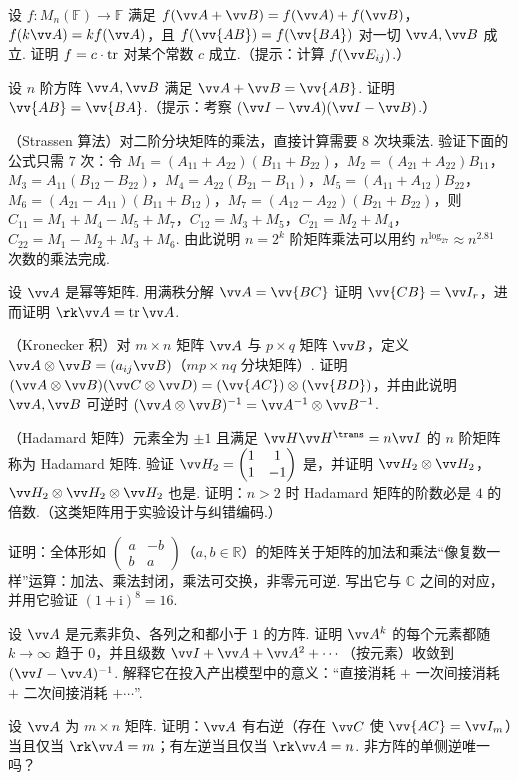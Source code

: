 {		\Cgroup
		\begin{exC}
			\item\label{ex:mat:C1} 设 $f:M_n(\mathbb{F})\to\mathbb{F}$ 满足 $f(\vv A+\vv B)=f(\vv A)+f(\vv B)$，$f(k\vv A)=kf(\vv A)$，且 $f(\vv{AB})=f(\vv{BA})$ 对一切 $\vv A,\vv B$ 成立. 证明 $f=c\cdot\operatorname{tr}$ 对某个常数 $c$ 成立.（提示：计算 $f(\vv E_{ij})$.）
			\item\label{ex:mat:C2} 设 $n$ 阶方阵 $\vv A,\vv B$ 满足 $\vv A+\vv B=\vv{AB}$. 证明 $\vv{AB}=\vv{BA}$.（提示：考察 $(\vv I-\vv A)(\vv I-\vv B)$.）
			\item\label{ex:mat:C3} （Strassen 算法）对二阶分块矩阵的乘法，直接计算需要 $8$ 次块乘法. 验证下面的公式只需 $7$ 次：令
			$M_1=(A_{11}+A_{22})(B_{11}+B_{22})$，$M_2=(A_{21}+A_{22})B_{11}$，$M_3=A_{11}(B_{12}-B_{22})$，$M_4=A_{22}(B_{21}-B_{11})$，$M_5=(A_{11}+A_{12})B_{22}$，$M_6=(A_{21}-A_{11})(B_{11}+B_{12})$，$M_7=(A_{12}-A_{22})(B_{21}+B_{22})$，则
			$C_{11}=M_1+M_4-M_5+M_7$，$C_{12}=M_3+M_5$，$C_{21}=M_2+M_4$，$C_{22}=M_1-M_2+M_3+M_6$. 由此说明 $n=2^k$ 阶矩阵乘法可以用约 $n^{\log_27}\approx n^{2.81}$ 次数的乘法完成.
			\item\label{ex:mat:C4} 设 $\vv A$ 是幂等矩阵. 用满秩分解 $\vv A=\vv{BC}$ 证明 $\vv{CB}=\vv I_r$，进而证明 $\rk\vv A=\tr\vv A$.
			\item\label{ex:mat:C5} （Kronecker 积）对 $m\times n$ 矩阵 $\vv A$ 与 $p\times q$ 矩阵 $\vv B$，定义 $\vv A\otimes\vv B=(a_{ij}\vv B)$（$mp\times nq$ 分块矩阵）. 证明 $(\vv A\otimes\vv B)(\vv C\otimes\vv D)=(\vv{AC})\otimes(\vv{BD})$，并由此说明 $\vv A,\vv B$ 可逆时 $(\vv A\otimes\vv B)^{-1}=\vv A^{-1}\otimes\vv B^{-1}$.
			\item\label{ex:mat:C6} （Hadamard 矩阵）元素全为 $\pm1$ 且满足 $\vv H\vv H^\trans=n\vv I$ 的 $n$ 阶矩阵称为 Hadamard 矩阵. 验证 $\vv H_2=\begin{pmatrix}1&1\\1&-1\end{pmatrix}$ 是，并证明 $\vv H_2\otimes\vv H_2$，$\vv H_2\otimes\vv H_2\otimes\vv H_2$ 也是. 证明：$n>2$ 时 Hadamard 矩阵的阶数必是 $4$ 的倍数.（这类矩阵用于实验设计与纠错编码.）
			\item\label{ex:mat:C7} 证明：全体形如 $\begin{pmatrix}a&-b\\b&a\end{pmatrix}$（$a,b\in\mathbb{R}$）的矩阵关于矩阵的加法和乘法“像复数一样”运算：加法、乘法封闭，乘法可交换，非零元可逆. 写出它与 $\mathbb{C}$ 之间的对应，并用它验证 $(1+\mathrm i)^8=16$.
			\item\label{ex:mat:C8} 设 $\vv A$ 是元素非负、各列之和都小于 $1$ 的方阵. 证明 $\vv A^k$ 的每个元素都随 $k\to\infty$ 趋于 $0$，并且级数 $\vv I+\vv A+\vv A^2+\cdots$（按元素）收敛到 $(\vv I-\vv A)^{-1}$. 解释它在投入产出模型中的意义：“直接消耗 $+$ 一次间接消耗 $+$ 二次间接消耗 $+\cdots$”.
			\item\label{ex:mat:C9} 设 $\vv A$ 为 $m\times n$ 矩阵. 证明：$\vv A$ 有右逆（存在 $\vv C$ 使 $\vv{AC}=\vv I_m$）当且仅当 $\rk\vv A=m$；有左逆当且仅当 $\rk\vv A=n$. 非方阵的单侧逆唯一吗？
		\end{exC}
	}
	
